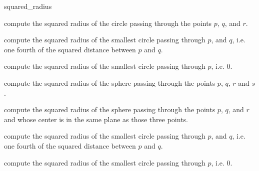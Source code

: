\begin{ccRefFunction}{squared_radius}

 {compute the squared radius of the circle passing through the points
 $p$, $q$, and $r$.  }

{compute the squared radius of the smallest circle passing through $p$,
and $q$, i.e. one fourth of the squared distance between $p$ and $q$.}

{compute the squared radius of the smallest circle passing through $p$, 
i.e. $0$.}

 {compute the squared radius of the sphere passing through the points $p$,
 $q$, $r$ and $s$.  }

 {compute the squared radius of the sphere passing through the points $p$,
 $q$, and $r$ and whose center is in the same plane as those three points.}

{compute the squared radius of the smallest circle passing through $p$,
and $q$, i.e. one fourth of the squared distance between $p$ and $q$.}

{compute the squared radius of the smallest circle passing through $p$, 
i.e. $0$.}

\ccSeeAlso
{} \\
 \\
 \\

\end{ccRefFunction}
